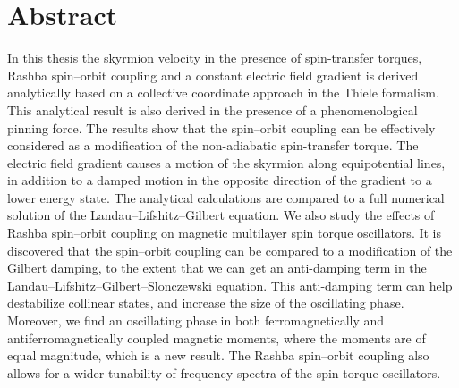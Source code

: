 \documentclass[12pt, a4paper, twoside, openright]{report}
\numberwithin{equation}{chapter}
\numberwithin{figure}{chapter}
\numberwithin{table}{chapter}
\begin{document}
\chapter*{Abstract}
In this thesis the skyrmion velocity in the presence of spin-transfer torques, Rashba spin--orbit coupling and a constant electric field gradient is derived analytically based on a collective coordinate approach in the Thiele formalism. This analytical result is also derived in the presence of a phenomenological pinning force. The results show that the spin--orbit coupling can be effectively considered as a modification of the non-adiabatic spin-transfer torque. The electric field gradient causes a motion of the skyrmion along equipotential lines, in addition to a damped motion in the opposite direction of the gradient to a lower energy state. The analytical calculations are compared to a full numerical solution of the Landau--Lifshitz--Gilbert equation. We also study the effects of Rashba spin--orbit coupling on magnetic multilayer spin torque oscillators. It is discovered that the spin--orbit coupling can be compared to a modification of the Gilbert damping, to the extent that we can get an anti-damping term in the Landau--Lifshitz--Gilbert--Slonczewski equation. This anti-damping term can help destabilize collinear states, and increase the size of the oscillating phase. Moreover, we find an oscillating phase in both ferromagnetically and antiferromagnetically coupled magnetic moments, where the moments are of equal magnitude, which is a new result. The Rashba spin--orbit coupling also allows for a wider tunability of frequency spectra of the spin torque oscillators.
\newpage
\end{document}
